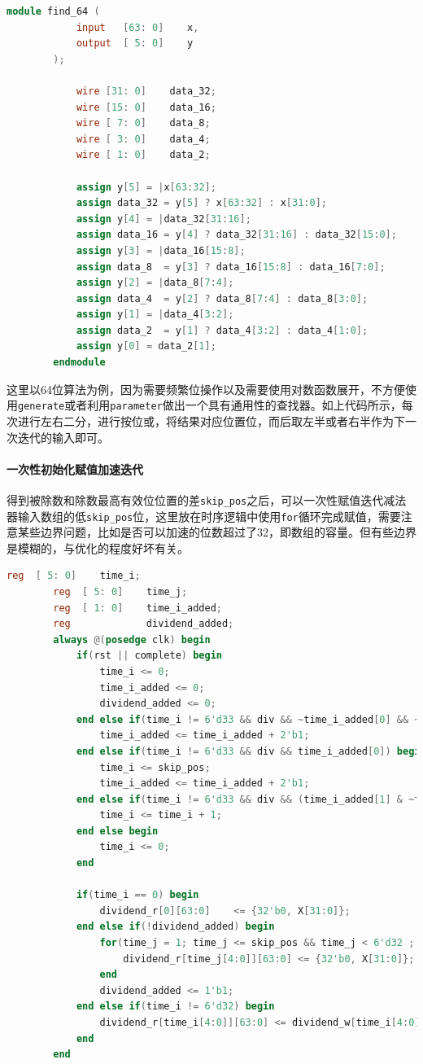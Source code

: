 \documentclass[UTF-8,twoside,c5size]{ctexart}
\begin{document}
	\begin{lstlisting}[language=verilog]
		module find_64 (
			input   [63: 0]    x,
			output  [ 5: 0]    y
		);
		
			wire [31: 0]    data_32;
			wire [15: 0]    data_16;
			wire [ 7: 0]    data_8;
			wire [ 3: 0]    data_4;
			wire [ 1: 0]    data_2;
			
			assign y[5] = |x[63:32];
			assign data_32 = y[5] ? x[63:32] : x[31:0];
			assign y[4] = |data_32[31:16];
			assign data_16 = y[4] ? data_32[31:16] : data_32[15:0];
			assign y[3] = |data_16[15:8];
			assign data_8  = y[3] ? data_16[15:8] : data_16[7:0];
			assign y[2] = |data_8[7:4];
			assign data_4  = y[2] ? data_8[7:4] : data_8[3:0];
			assign y[1] = |data_4[3:2];
			assign data_2  = y[1] ? data_4[3:2] : data_4[1:0];
			assign y[0] = data_2[1];
		endmodule
	\end{lstlisting}

	这里以64位算法为例，因为需要频繁位操作以及需要使用对数函数展开，不方便使用\texttt{generate}或者利用\texttt{parameter}做出一个具有通用性的查找器。如上代码所示，每次进行左右二分，进行按位或，将结果对应位置位，而后取左半或者右半作为下一次迭代的输入即可。
	
	\paragraph{一次性初始化赋值加速迭代}\hfill
	
	得到被除数和除数最高有效位位置的差\texttt{skip\_pos}之后，可以一次性赋值迭代减法器输入数组的低\texttt{skip\_pos}位，这里放在时序逻辑中使用\texttt{for}循环完成赋值，需要注意某些边界问题，比如是否可以加速的位数超过了32，即数组的容量。但有些边界是模糊的，与优化的程度好坏有关。
	
	\begin{lstlisting}[language=verilog]
		reg  [ 5: 0]    time_i;
		reg  [ 5: 0]    time_j;
		reg  [ 1: 0]    time_i_added;
		reg             dividend_added;
		always @(posedge clk) begin
			if(rst || complete) begin
				time_i <= 0;
				time_i_added <= 0;
				dividend_added <= 0;
			end else if(time_i != 6'd33 && div && ~time_i_added[0] && ~time_i_added[1]) begin
				time_i_added <= time_i_added + 2'b1;
			end else if(time_i != 6'd33 && div && time_i_added[0]) begin
				time_i <= skip_pos;
				time_i_added <= time_i_added + 2'b1;
			end else if(time_i != 6'd33 && div && (time_i_added[1] & ~time_i_added[0])) begin
				time_i <= time_i + 1;
			end else begin
				time_i <= 0;
			end
			
			if(time_i == 0) begin
				dividend_r[0][63:0]    <= {32'b0, X[31:0]};
			end else if(!dividend_added) begin
				for(time_j = 1; time_j <= skip_pos && time_j < 6'd32 ; time_j = time_j + 1) begin
					dividend_r[time_j[4:0]][63:0] <= {32'b0, X[31:0]};
				end
				dividend_added <= 1'b1;
			end else if(time_i != 6'd32) begin
				dividend_r[time_i[4:0]][63:0] <= dividend_w[time_i[4:0]-1][63:0];
			end
		end
	\end{lstlisting}
\end{document}
